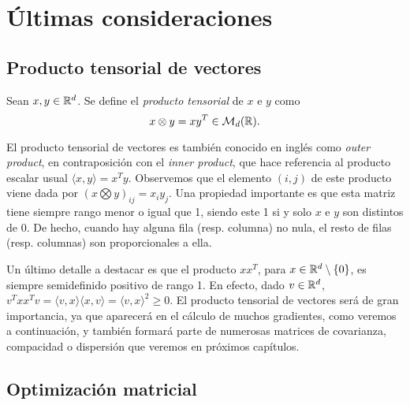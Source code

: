 \section{Últimas consideraciones}

\subsection{Producto tensorial de vectores}

\begin{definition}
    Sean $x,y \in \mathbb{R}^d$. Se define el \emph{producto tensorial} de $x$ e $y$ como
    \[ x \otimes y = xy^T \in \mathcal{M}_d(\mathbb{R}). \]
\end{definition}

El producto tensorial de vectores es también conocido en inglés como \emph{outer product}, en contraposición con el \emph{inner product}, que hace referencia al producto escalar usual $\langle x, y \rangle = x^Ty$. Observemos que el elemento $(i,j)$ de este producto viene dada por $(x \bigotimes y)_{ij} = x_iy_j$. Una propiedad importante es que esta matriz tiene siempre rango menor o igual que 1, siendo este 1 si y solo $x$ e $y$ son distintos de 0. De hecho, cuando hay alguna fila (resp. columna) no nula, el resto de filas (resp. columnas) son proporcionales a ella.

Un último detalle a destacar es que el producto $xx^T$, para $x \in \mathbb{R}^{d}\setminus \{0\}$, es siempre semidefinido positivo de rango 1. En efecto, dado $v \in \mathbb{R}^d$, $v^Txx^Tv = \langle v,x \rangle\langle x,v \rangle = \langle v,x \rangle^2 \ge 0$. El producto tensorial de vectores será de gran importancia, ya que aparecerá en el cálculo de muchos gradientes, como veremos a continuación, y también formará parte de numerosas matrices de covarianza, compacidad o dispersión que veremos en próximos capítulos.

\subsection{Optimización matricial}

